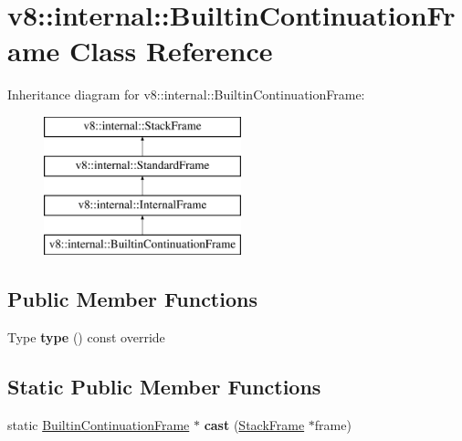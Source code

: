 \hypertarget{classv8_1_1internal_1_1BuiltinContinuationFrame}{}\section{v8\+:\+:internal\+:\+:Builtin\+Continuation\+Frame Class Reference}
\label{classv8_1_1internal_1_1BuiltinContinuationFrame}
Inheritance diagram for v8\+:\+:internal\+:\+:Builtin\+Continuation\+Frame\+:\begin{figure}[H]
\begin{center}
\leavevmode
\includegraphics[height=4.000000cm]{classv8_1_1internal_1_1BuiltinContinuationFrame}
\end{center}
\end{figure}
\subsection*{Public Member Functions}
\begin{DoxyCompactItemize}
\item 
\mbox{\label{classv8_1_1internal_1_1BuiltinContinuationFrame_a5a838fbd26b990457b8e1dc8ded1ecb4}} 
Type {\bfseries type} () const override
\end{DoxyCompactItemize}
\subsection*{Static Public Member Functions}
\begin{DoxyCompactItemize}
\item 
\mbox{\label{classv8_1_1internal_1_1BuiltinContinuationFrame_a22c80170de39b13a627d47d0ae899ed9}} 
static \mbox{\hyperlink{classv8_1_1internal_1_1BuiltinContinuationFrame}{Builtin\+Continuation\+Frame}} $\ast$ {\bfseries cast} (\mbox{\hyperlink{classv8_1_1internal_1_1StackFrame}{Stack\+Frame}} $\ast$frame)
\end{DoxyCompactItemize}
